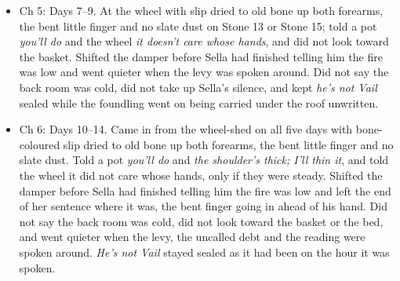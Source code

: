 \documentclass{design/chronicle}
\begin{document}
{\begin{itemize}[leftmargin=1.4em,itemsep=1pt,topsep=3pt,parsep=0pt]
\end{itemize}

\begin{itemize}[leftmargin=1.4em,itemsep=1pt,topsep=3pt,parsep=0pt]

\item Ch 5: Days 7--9. At the wheel with slip dried to old bone up both forearms, the bent little finger and no slate dust on Stone 13 or Stone 15; told a pot \emph{you’ll do} and the wheel \emph{it doesn’t care whose hands}, and did not look toward the basket. Shifted the damper before Sella had finished telling him the fire was low and went quieter when the levy was spoken around. Did not say the back room was cold, did not take up Sella’s silence, and kept \emph{he’s not Vail} sealed while the foundling went on being carried under the roof unwritten.

\end{itemize}

\begin{itemize}[leftmargin=1.4em,itemsep=1pt,topsep=3pt,parsep=0pt]

\item Ch 6: Days 10--14. Came in from the wheel-shed on all five days with bone-coloured slip dried to old bone up both forearms, the bent little finger and no slate dust. Told a pot \emph{you’ll do} and \emph{the shoulder’s thick; I’ll thin it}, and told the wheel it did not care whose hands, only if they were steady. Shifted the damper before Sella had finished telling him the fire was low and left the end of her sentence where it was, the bent finger going in ahead of his hand. Did not say the back room was cold, did not look toward the basket or the bed, and went quieter when the levy, the uncalled debt and the reading were spoken around. \emph{He’s not Vail} stayed sealed as it had been on the hour it was spoken.

\end{itemize}

\begin{itemize}[leftmargin=1.4em,itemsep=1pt,topsep=3pt,parsep=0pt]


\end{itemize}}
\end{document}
